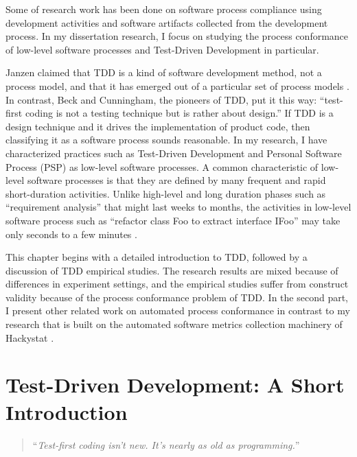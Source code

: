 Some of research work 
\cite{Cook:95,Jensen:05,csdl2-06-02,Wang:04,Wege:04} has been 
done on software process compliance using development activities 
and software artifacts collected from the development process. 
In my dissertation research, I focus on studying the process 
conformance of low-level software processes and Test-Driven 
Development in particular. 

Janzen claimed that TDD is a kind of software development method,
not a process model, and that it has emerged out of a particular 
set of process models \cite{Janzen:05}. In contrast, Beck and 
Cunningham, the pioneers of TDD, put it this way: ``test-first 
coding is not a testing technique but is rather about design.''
\cite{Beck:01} If TDD is a design technique and it drives the 
implementation of product code, then classifying it as a software 
process sounds reasonable. In my research, I have characterized
practices such as Test-Driven Development and Personal Software 
Process (PSP) as low-level software processes. A common 
characteristic of low-level software processes is that they are defined 
by many frequent and rapid short-duration activities. Unlike high-level 
and long duration phases such as ``requirement analysis'' that might 
last weeks to months, the activities in low-level software process 
such as ``refactor class Foo to extract interface IFoo'' may take 
only seconds to a few minutes \cite{csdl2-06-02}.

This chapter begins with a detailed introduction to TDD, followed 
by a discussion of TDD empirical studies.
The research results are mixed because of differences in experiment
settings, and the empirical studies suffer from construct validity
because of the process conformance problem of TDD. In the second
part, I present other related work on automated process conformance 
in contrast to my research that is built on the automated software 
metrics collection machinery of 
Hackystat \cite{Hackystat,csdl2-01-12,csdl2-01-13,csdl2-02-07}. 

\section{Test-Driven Development: A Short Introduction}
\label{sec:related-tdd}
\begin{quotation}
``\textit{Test-first coding isn't new. It's nearly as old as programming.}''

\end{quotation}

